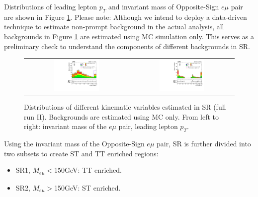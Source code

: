 Distributions of leading lepton $p_{T}$ and invariant mass of Opposite-Sign $e\mu$ pair are shown in Figure \ref{fig:SR}. Please note: Although we intend to deploy a data-driven technique to estimate non-prompt background in the actual analysis, all backgrounds in Figure \ref{fig:SR} are estimated using MC simulation only. This serves as a preliminary check to understand the components of different backgrounds in SR. 
\begin{figure}[tbh!]
 \begin{center}
 \begin{tabular}{cc}
 \includegraphics[width=0.45\textwidth]{figures/Part3/Selection/Memu}&
 \includegraphics[width=0.45\textwidth]{figures/Part3/Selection/Zmass} \\
 \end{tabular}
 \caption{Distributions of different kinematic variables estimated in SR (full run II). Backgrounds are estimated using MC only. From left to right: invariant mass of the $e\mu$ pair, leading lepton $p_{T}$.}
 \label{fig:SR}
 \end{center}
\end{figure}

Using the invariant mass of the Opposite-Sign $e\mu$ pair, SR is further divided into two subsets to create ST and TT enriched regions:
\begin{itemize}
\item SR1, $M_{e\mu}<$150GeV: TT enriched.
\item SR2, $M_{e\mu}>$150GeV: ST enriched.
\end{itemize}

